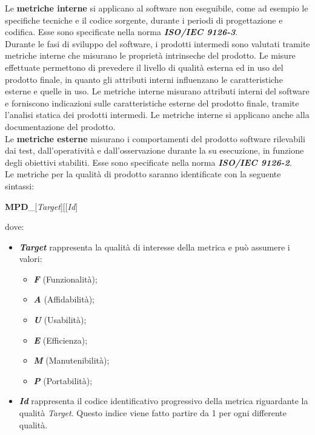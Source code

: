 Le \textbf{metriche interne} si applicano al software non eseguibile, come ad esempio le specifiche tecniche e il codice sorgente, durante i periodi di progettazione e codifica.
Esse sono specificate nella norma \textbf{\textit{ISO/IEC 9126-3}}.\\
Durante le fasi di sviluppo del software, i prodotti intermedi sono valutati tramite metriche interne che misurano le proprietà intrinseche del prodotto.
Le misure effettuate permettono di prevedere il livello di qualità esterna ed in uso del prodotto finale, in quanto gli attributi interni influenzano le caratteristiche esterne e quelle in uso.
Le metriche interne misurano attributi interni del software e forniscono indicazioni sulle caratteristiche esterne del prodotto finale, tramite l'analisi statica dei prodotti intermedi.
Le metriche interne si applicano anche alla documentazione del prodotto.\\
Le \textbf{metriche esterne} misurano i comportamenti del prodotto software rilevabili dai test, dall'operatività e dall'osservazione durante la su esecuzione, in funzione degli obiettivi stabiliti.
Esse sono specificate nella norma \textbf{\textit{ISO/IEC 9126-2}}.\\
Le metriche per la qualità di prodotto saranno identificate con la seguente sintassi:
\begin{center}
	\textbf{MPD}\_[\textit{Target}][[\textit{Id}]
\end{center}
dove:
\begin{itemize}
	\item \textbf{\textit{Target}} rappresenta la qualità di interesse della metrica e può assumere i valori:
	\begin{itemize}
		\item \textbf{\textit{F}} (Funzionalità);
		\item \textbf{\textit{A}} (Affidabilità);
		\item \textbf{\textit{U}} (Usabilità);
		\item \textbf{\textit{E}} (Efficienza);
		\item \textbf{\textit{M}} (Manutenibilità);
		\item \textbf{\textit{P}} (Portabilità);
	\end{itemize}
	\item \textbf{\textit{Id}} rappresenta il codice identificativo progressivo della metrica riguardante la qualità \textit{Target}. Questo indice viene fatto partire da 1 per ogni differente qualità.
\end{itemize}	


